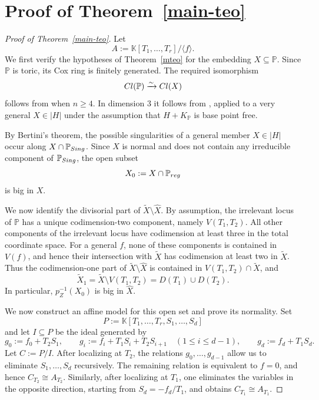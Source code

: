 \documentclass{amsart}
\theoremstyle{definition}
\theoremstyle{remark}
\begin{document}
\section{Proof of Theorem~\ref{main-teo}}
\label{sec:proof1}

\begin{proof}[Proof of Theorem~\ref{main-teo}]
Let
\[
A:=\mathbb K[T_1,\dots,T_r]/\langle f\rangle.
\]
We first verify the hypotheses of Theorem~\ref{mteo} for the embedding
$X\subseteq\mathbb P$. Since $\mathbb P$ is toric, its Cox ring is finitely generated.
The required isomorphism
\[
{\rm Cl}(\mathbb P)\xrightarrow{\sim}{\rm Cl}(X)
\]
follows from \cite[Thm.~1]{rs} when $n\geq 4$. In dimension $3$ it follows from
\cite[Thm.~1]{rs2}, applied to a very general $X\in |H|$ under the assumption that $H+K_{\mathbb P}$ is base point free.

By Bertini's theorem, the possible singularities of a general member
$X\in |H|$ occur along $X\cap \mathbb P_{\rm Sing}$. Since $X$ is normal and does not contain any irreducible component of $\mathbb P_{\rm Sing}$, the open subset
\[
X_0:=X\cap\mathbb P_{\rm reg}
\]
is big in $X$.

We now identify the divisorial part of $\tilde X\setminus\widehat X$.
By assumption, the irrelevant locus of $\mathbb P$ has a unique codimension-two component, namely $V(T_1,T_2)$. All other components of the irrelevant locus have codimension at least three in the total coordinate space. For a general $f$, none of these components is contained in $V(f)$, and hence their intersection with $\tilde X$ has codimension at least two in $\tilde X$. Thus the codimension-one part of $\tilde X\setminus\widehat X$ is contained in $V(T_1,T_2)\cap\tilde X$, and
\[
 \tilde X_1=\tilde X\setminus V(T_1,T_2)
 =D(T_1)\cup D(T_2).
\]
In particular, $p_Z^{-1}(X_0)$ is big in $\widehat X$.

We now construct an affine model for this open set and prove its normality.
Set
\[
P:=\mathbb K[T_1,\dots,T_r,S_1,\dots,S_d]
\]
and let $I\subseteq P$ be the ideal generated by
\[
g_0:=f_0+T_2S_1,
\qquad
 g_i:=f_i+T_1S_i+T_2S_{i+1}\quad (1\leq i\leq d-1),
\qquad
 g_d:=f_d+T_1S_d.
\]
Let $C:=P/I$. After localizing at $T_2$, the relations $g_0,\dots,g_{d-1}$ allow us to eliminate $S_1,\dots,S_d$ recursively. The remaining relation is equivalent to $f=0$, and hence $C_{T_2}\cong A_{T_2}$. Similarly, after localizing at $T_1$, one eliminates the variables in the opposite direction, starting from $S_d=-f_d/T_1$, and obtains $C_{T_1}\cong A_{T_1}$.


\end{proof}
\end{document}
